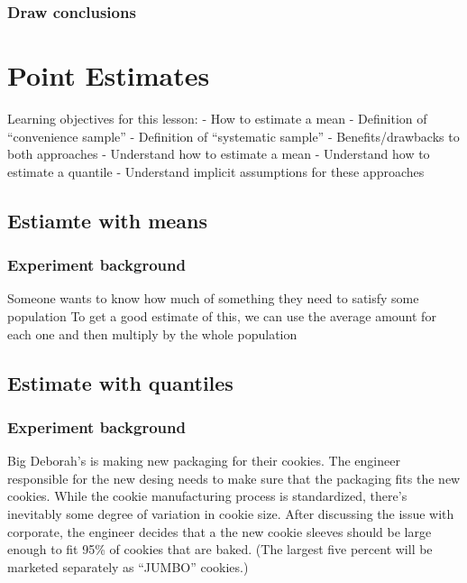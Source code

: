 \documentclass[]{book}
\begin{document}
\hypertarget{draw-conclusions-1}{%
\subsection{Draw conclusions}\label{draw-conclusions-1}}

\hypertarget{point-estimates}{%
\chapter{Point Estimates}\label{point-estimates}}

Learning objectives for this lesson:
- How to estimate a mean
- Definition of ``convenience sample''
- Definition of ``systematic sample''
- Benefits/drawbacks to both approaches
- Understand how to estimate a mean
- Understand how to estimate a quantile
- Understand implicit assumptions for these approaches

\hypertarget{estiamte-with-means}{%
\section{Estiamte with means}\label{estiamte-with-means}}

\hypertarget{experiment-background-2}{%
\subsection{Experiment background}\label{experiment-background-2}}

Someone wants to know how much of something they need to satisfy some population
To get a good estimate of this, we can use the average amount for each one and then multiply by the whole population

\hypertarget{estimate-with-quantiles}{%
\section{Estimate with quantiles}\label{estimate-with-quantiles}}

\hypertarget{experiment-background-3}{%
\subsection{Experiment background}\label{experiment-background-3}}

Big Deborah's is making new packaging for their cookies. The engineer responsible for the new desing needs to make sure that the packaging fits the new cookies. While the cookie manufacturing process is standardized, there's inevitably some degree of variation in cookie size. After discussing the issue with corporate, the engineer decides that a the new cookie sleeves should be large enough to fit 95\% of cookies that are baked. (The largest five percent will be marketed separately as ``JUMBO'' cookies.)
\end{document}
